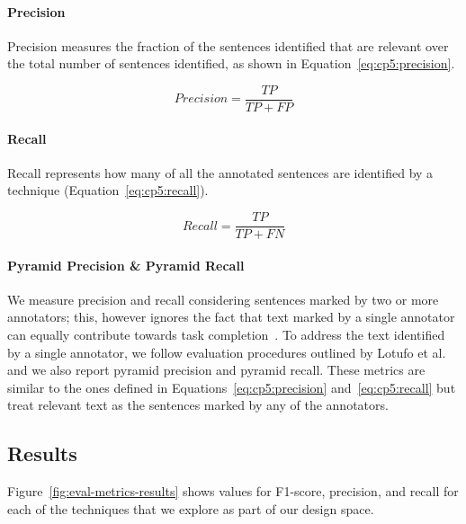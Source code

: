 \paragraph{\textbf{Precision}}

Precision measures the fraction of the sentences identified that are relevant over the total number of sentences identified, as shown in Equation~\ref{eq:cp5:precision}.



\begin{equation}
\label{eq:cp5:precision}    
    Precision = \frac{TP}{TP + FP}
\end{equation}


\paragraph{\textbf{Recall}} Recall represents how many of all the annotated sentences are identified by a technique (Equation~\ref{eq:cp5:recall}).


\begin{equation}
\label{eq:cp5:recall}        
    Recall = \frac{TP}{TP + FN}
\end{equation}



\paragraph{\textbf{Pyramid Precision \& Pyramid Recall}} 

We measure precision and recall considering sentences marked by two or more annotators; this, however ignores the fact that text marked by a single annotator can equally contribute towards task completion~\cite{marques2020}. To address the text identified by a single annotator, we 
follow evaluation procedures outlined by Lotufo et al.~\cite{Lotufo2012} and we
also report pyramid precision and pyramid recall. These metrics are similar to the ones defined in 
Equations~\ref{eq:cp5:precision} and~\ref{eq:cp5:recall} but treat relevant text as the sentences marked by any of the annotators.





\subsection{Results}




Figure~\ref{fig:eval-metrics-results} shows values for F1-score, precision, and recall for each of the techniques that we explore as part of our design space. 



